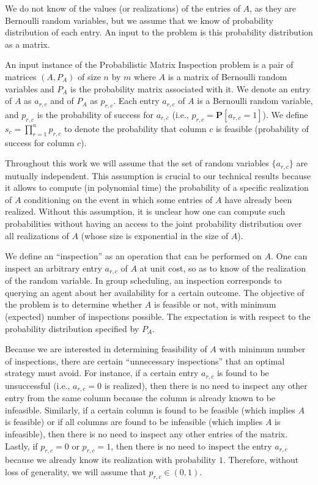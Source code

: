 We do not know of the values (or realizations) of the entries of $A$, as they are Bernoulli random variables, but we assume that we know of probability distribution of each entry. An input to the problem is this probability distribution as a matrix. 
 \begin{definition}
 An input instance of the Probabilistic Matrix Inspection problem is a pair of matrices $(A, P_A)$ of size $n$ by $m$
 where $A$ is a matrix of Bernoulli random variables 
 and $P_A$ is the probability matrix associated with it.
 We denote an entry of $A$ as $a_{r,c}$ and of $P_A$ as $p_{r,c}$.
 Each entry $a_{r,c}$ of $A$ is a Bernoulli random variable, and $p_{r,c}$ is the probability of success for $a_{r,c}$ (i.e., $p_{r,c} = \mathbf{P}[a_{r,c} = 1]$).
 We define $s_c = \prod_{r=1}^{n} p_{r,c}$ to denote the probability that column $c$ is feasible (probability of success for column $c$).
 \end{definition}
 Throughout this work we will assume that the set of random variables $\{a_{r,c}\}$ are mutually independent. This assumption is crucial to our technical results because it allows to compute (in polynomial time) the probability of a specific realization of $A$ conditioning on the event in which some entries of $A$ have already been realized. 
 Without this assumption, it is unclear how one can compute such probabilities without having an access to the joint probability distribution over all realizations of $A$ (whose size is exponential in the size of $A$).

 We define an ``inspection'' as an operation that can be performed on $A$. 
 One can inspect an arbitrary entry $a_{r,c}$ of $A$ at unit cost, so as to know of the realization of the random variable. In group scheduling, an inspection corresponds to querying an agent about her availability for a certain outcome. 
 The objective of the problem is to determine whether $A$ is feasible or not, with minimum (expected) number of inspections possible. The expectation is with respect to the probability distribution specified by $P_A$.

 Because we are interested in determining feasibility of $A$ with minimum number of inspections, there are certain ``unnecessary inspections'' that an optimal strategy must avoid.
 For instance, if a certain entry $a_{r,c}$ is found to be unsuccessful (i.e., $a_{r,c} = 0$ is realized), then there is no need to inspect any other entry from the same column because the column is already known to be infeasible. Similarly, if a certain column is found to be feasible (which implies $A$ is feasible) or if all columns are found to be infeasible (which implies $A$ is infeasible), then there is no need to inspect any other entries of the matrix. Lastly, if $p_{r,c} = 0$ or $p_{r,c} = 1$, then there is no need to inspect the entry $a_{r,c}$ because we already know its realization with probability $1$.
 Therefore, without loss of generality, we will assume that $p_{r,c} \in (0,1)$.

